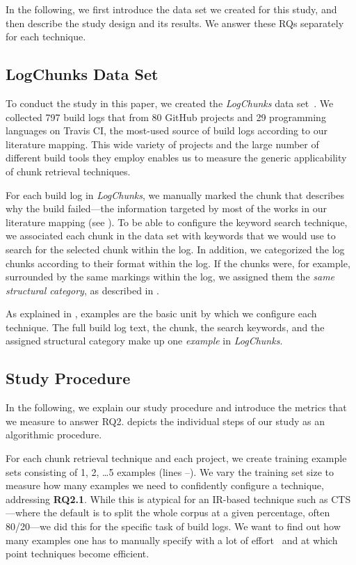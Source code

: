 In the following, we first introduce the data set we created for this
study, and then describe the study design and its
results.
We answer these RQs separately for each technique.

\subsection{LogChunks Data Set}
\label{sec:logchunks}
To conduct the study in this paper, we created the
\emph{LogChunks} data set~\citep{brandt2020logchunks}.
We collected 797 build logs that
from 80 GitHub projects and 29
programming languages on Travis CI, the most-used source of build logs
according to our literature mapping.
This wide variety of projects and the large number of different build
tools they employ enables us to measure the generic
applicability of chunk retrieval techniques.

For each build log in \emph{LogChunks}, we manually marked
the chunk that describes why the build
failed---the information targeted by most of the works in our
literature mapping (see ).
To be able to configure the keyword search technique,
we associated each chunk in the data set with keywords that we
would use to search for the selected chunk within the log.
In
addition, we categorized the log chunks according to their format
within the log.
If the chunks were, for example, surrounded by the same markings
within the log, we assigned them the \emph{same structural category},
as described in .

As explained in , examples are the basic
unit by which we configure each technique.
The full build log text,
the chunk, the search keywords, and the assigned
structural category make
up one \emph{example} in \emph{LogChunks}.

\subsection{Study Procedure}

In the following, we explain our study procedure
and introduce the metrics that
we measure to answer RQ2.
 depicts the individual steps of our study as an
algorithmic procedure.

For each chunk retrieval technique and each project, we create
training example sets consisting of 1, 2, \dots 5 examples (lines
--).
We vary the training set size to measure how many examples we need to
confidently configure a technique, addressing \textbf{RQ2.1}.
While this is atypical for an IR-based technique such as CTS---where
the default is to split the whole corpus at a given percentage, often
80/20---we did this for the specific task of build logs.
We want to find out how many examples one has to manually specify with a
lot of effort~ and at which point techniques
become efficient.

